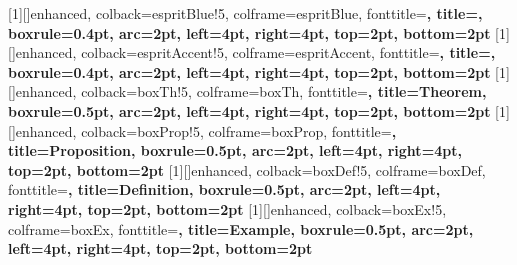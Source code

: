 


[1][]{enhanced, colback=espritBlue!5, colframe=espritBlue,
  fonttitle=\bfseries\small,
  title={},
  boxrule=0.4pt, arc=2pt, left=4pt, right=4pt, top=2pt, bottom=2pt}
[1][]{enhanced, colback=espritAccent!5, colframe=espritAccent,
  fonttitle=\bfseries\small,
  title={},
  boxrule=0.4pt, arc=2pt, left=4pt, right=4pt, top=2pt, bottom=2pt}
[1][]{enhanced, colback=boxTh!5, colframe=boxTh,
  fonttitle=\bfseries\small,
  title={Theorem},
  boxrule=0.5pt, arc=2pt, left=4pt, right=4pt, top=2pt, bottom=2pt}
[1][]{enhanced, colback=boxProp!5, colframe=boxProp,
  fonttitle=\bfseries\small,
  title={Proposition},
  boxrule=0.5pt, arc=2pt, left=4pt, right=4pt, top=2pt, bottom=2pt}
[1][]{enhanced, colback=boxDef!5, colframe=boxDef,
  fonttitle=\bfseries\small,
  title={Definition},
  boxrule=0.5pt, arc=2pt, left=4pt, right=4pt, top=2pt, bottom=2pt}
[1][]{enhanced, colback=boxEx!5, colframe=boxEx,
  fonttitle=\bfseries\small,
  title={Example},
  boxrule=0.5pt, arc=2pt, left=4pt, right=4pt, top=2pt, bottom=2pt}
